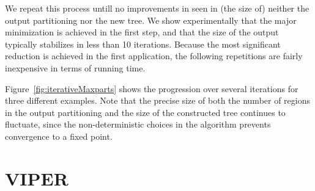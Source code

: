 We repeat this process untill no improvements in seen in (the size of) neither
the output partitioning nor the new tree. We show experimentally that the major
minimization is achieved in the first step, and that the size of the
output typically stabilizes in less than 10 iterations. Because the most
significant reduction is achieved in the first application, the following
repetitions are fairly inexpensive in terms of running time.

Figure~\cref{fig:iterativeMaxparts} shows the progression over several
iterations for three different examples. Note that the precise size of both the
number of regions in the output partitioning and the size of the constructed
tree continues to fluctuate, since the non-deterministic choices in the
algorithm prevents convergence to a fixed point.

\section{VIPER}%
\label{sec:viper}

\textcolor {orange} {\lipsum[2]}
